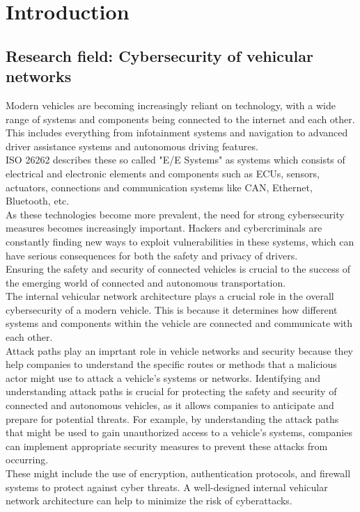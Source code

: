 \chapter{Introduction}
\label{chp:introduction}

\section{Research field: Cybersecurity of vehicular networks}\label{sec:field}

Modern vehicles are becoming increasingly reliant on technology, 
with a wide range of systems and components being connected to the internet and each other. 
This includes everything from infotainment systems and navigation to advanced driver assistance systems and autonomous driving features.\\
ISO 26262 describes these so called "E/E Systems" as systems which consists of electrical and electronic elements
and components such as ECUs, sensors, actuators, connections and communication systems like CAN, Ethernet, Bluetooth, etc.\cite{iso26262}\\
As these technologies become more prevalent, the need for strong cybersecurity measures becomes increasingly important. 
Hackers and cybercriminals are constantly finding new ways to exploit vulnerabilities in these systems, 
which can have serious consequences for both the safety and privacy of drivers.\\
Ensuring the safety and security of connected vehicles is crucial to 
the success of the emerging world of connected and autonomous transportation.\\

The internal vehicular network architecture plays a crucial role in the overall cybersecurity of a modern vehicle. 
This is because it determines how different systems and components within the vehicle are connected and communicate with each other.\\
Attack paths play an imprtant role in vehicle networks and security because they help companies to understand the specific routes 
or methods that a malicious actor might use to attack a vehicle's systems or networks. 
Identifying and understanding attack paths is crucial for protecting the safety and security 
of connected and autonomous vehicles, as it allows companies to anticipate and prepare for potential threats.
For example, by understanding the attack paths that might be used to gain unauthorized access to a vehicle's systems, 
companies can implement appropriate security measures to prevent these attacks from occurring.\\
These might include the use of encryption, authentication protocols, and firewall systems to protect against cyber threats.
A well-designed internal vehicular network architecture can help to minimize the risk of cyberattacks.\\

